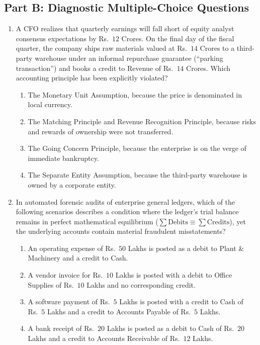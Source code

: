 \subsection*{Part B: Diagnostic Multiple-Choice Questions}

\begin{enumerate}[label=\textbf{MCQ 1.\arabic*}]
    \item A CFO realizes that quarterly earnings will fall short of equity analyst consensus expectations by Rs.~$12$ Crores. On the final day of the fiscal quarter, the company ships raw materials valued at Rs.~$14$ Crores to a third-party warehouse under an informal repurchase guarantee (``parking transaction'') and books a credit to Revenue of Rs.~$14$ Crores. Which accounting principle has been explicitly violated?
    \begin{enumerate}[label=(\alph*)]
        \item The Monetary Unit Assumption, because the price is denominated in local currency.
        \item The Matching Principle and Revenue Recognition Principle, because risks and rewards of ownership were not transferred.
        \item The Going Concern Principle, because the enterprise is on the verge of immediate bankruptcy.
        \item The Separate Entity Assumption, because the third-party warehouse is owned by a corporate entity.
    \end{enumerate}

    \item In automated forensic audits of enterprise general ledgers, which of the following scenarios describes a condition where the ledger's trial balance remains in perfect mathematical equilibrium ($\sum \text{Debits} \equiv \sum \text{Credits}$), yet the underlying accounts contain material fraudulent misstatements?
    \begin{enumerate}[label=(\alph*)]
        \item An operating expense of Rs.~$50$ Lakhs is posted as a debit to Plant \& Machinery and a credit to Cash.
        \item A vendor invoice for Rs.~$10$ Lakhs is posted with a debit to Office Supplies of Rs.~$10$ Lakhs and no corresponding credit.
        \item A software payment of Rs.~$5$ Lakhs is posted with a credit to Cash of Rs.~$5$ Lakhs and a credit to Accounts Payable of Rs.~$5$ Lakhs.
        \item A bank receipt of Rs.~$20$ Lakhs is posted as a debit to Cash of Rs.~$20$ Lakhs and a credit to Accounts Receivable of Rs.~$12$ Lakhs.
    \end{enumerate}
\end{enumerate}
